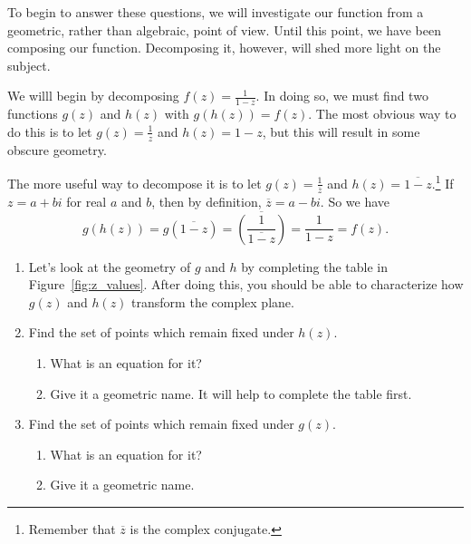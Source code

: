 \documentclass[../gatm.tex]{subfiles}
\begin{document}
To begin to answer these questions, we will investigate our function from a geometric, rather than algebraic, point of view. Until this point, we have been composing our function. Decomposing it, however, will shed more light on the subject.

We willl begin by decomposing $f(z)=\frac{1}{1-z}$. In doing so, we must find two functions $g(z)$ and $h(z)$ with $g(h(z))=f(z)$. The most obvious way to do this is to let $g(z)=\frac{1}{z}$ and $h(z)=1-z$, but this will result in some obscure geometry.

The more useful way to decompose it is to let $g(z)=\frac{1}{\overline{z}}$ and $h(z)=\overline{1-z}$.\footnote{Remember that $\overline{z}$ is the complex conjugate.} If $z=a+bi$ for real $a$ and $b$, then by definition, $\overline{z}=a-bi$. So we have
$$g(h(z))=g(\overline{1-z})=\overline{\left(\frac{1}{\overline{1-z}}\right)}=\frac{1}{1-z}=f(z).$$

\begin{enumerate}
\setcounter{enumi}{\value{problem_i}}
\item Let's look at the geometry of $g$ and $h$ by completing the table in Figure~\ref{fig:z_values}. After doing this, you should be able to characterize how $g(z)$ and $h(z)$ transform the complex plane.
\item Find the set of points which remain fixed under $h(z)$.
\begin{enumerate}
\item What is an equation for it?
\item Give it a geometric name. It will help to complete the table first.
\end{enumerate}
\item Find the set of points which remain fixed under $g(z)$. 
\begin{enumerate}
\item What is an equation for it?
\item Give it a geometric name.
\end{enumerate}
\setcounter{problem_i}{\value{enumi}}
\end{enumerate}
\end{document}
